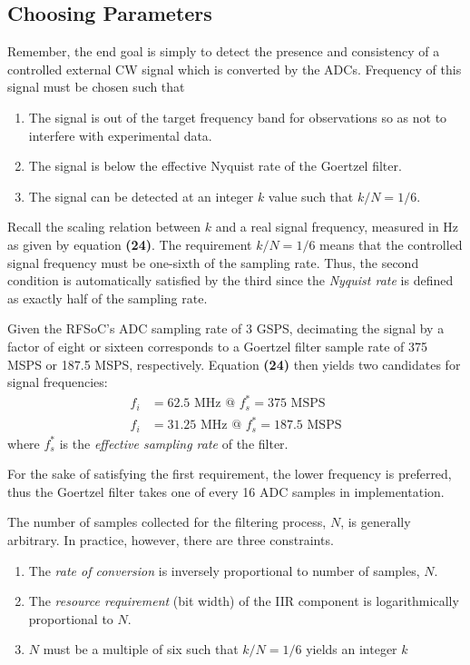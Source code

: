 \documentclass[reprint,amsmath,amssymb,aps,pra]{revtex4-2}
\begin{document}
\subsection{Choosing Parameters}

Remember, the end goal is simply to detect the presence and consistency of a controlled external CW signal which is converted by the ADCs. Frequency of this signal must be chosen such that 
\begin{enumerate}
    \item The signal is out of the target frequency band for observations so as not to interfere with experimental data.
    \item The signal is below the effective Nyquist rate of the Goertzel filter.
    \item The signal can be detected at an integer $k$ value such that $k/N = 1/6$. 
\end{enumerate}

Recall the scaling relation between $k$ and a real signal frequency, measured in Hz as given by equation \textbf{(24)}. The requirement $k/N = 1/6$ means that the controlled signal frequency must be one-sixth of the sampling rate. Thus, the second condition is automatically satisfied by the third since the \textit{Nyquist rate} is defined as exactly half of the sampling rate.

Given the RFSoC's ADC sampling rate of 3 GSPS, decimating the signal by a factor of eight or sixteen corresponds to a Goertzel filter sample rate of 375 MSPS or 187.5 MSPS, respectively. Equation \textbf{(24)} then yields two candidates for signal frequencies:
\begin{align}
    f_i & = 62.5 \text{ MHz @ } f_s^* = 375 \text{ MSPS} \nonumber \\
    f_i & = 31.25 \text{ MHz @ } f_s^* = 187.5 \text{ MSPS} \nonumber
\end{align}
where $f_s^*$ is the \textit{effective sampling rate} of the filter.

For the sake of satisfying the first requirement, the lower frequency is preferred, thus the Goertzel filter takes one of every 16 ADC samples in implementation.

The number of samples collected for the filtering process, $N$, is generally arbitrary. In practice, however, there are three constraints. 
\begin{enumerate}
    \item The \textit{rate of conversion} is inversely proportional to number of samples, $N$.
    \item The \textit{resource requirement} (bit width) of the IIR component is logarithmically proportional to $N$.
    \item $N$ must be a multiple of six such that $k/N = 1/6$ yields an integer $k$
\end{enumerate}
\end{document}
